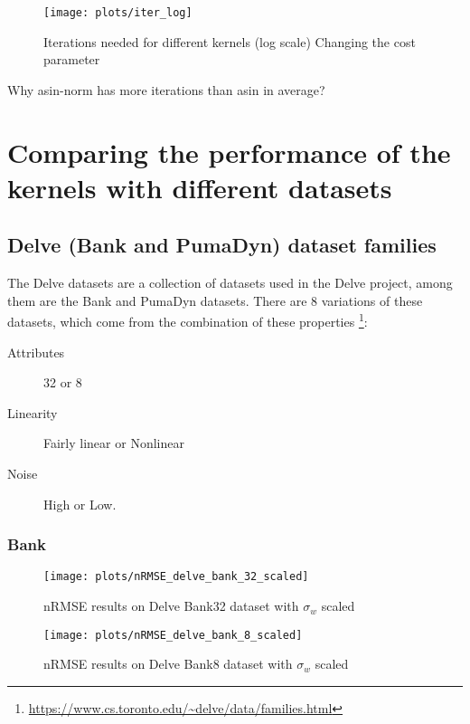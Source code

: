 \begin{figure}[H]
    \texttt{[image: plots/iter\_log]}
    \caption{Iterations needed for different kernels (log scale) Changing the cost
        parameter}
\end{figure}

\begin{cnote}
    Why asin-norm has more iterations than asin in average?
\end{cnote}

\section{Comparing the performance of the kernels with different datasets}%

\subsection{Delve (Bank and PumaDyn) dataset families}

The Delve datasets are a collection of datasets used in the Delve project,
among them are the Bank and PumaDyn datasets. There are 8 variations of
these datasets, which come from the combination of these properties%
\footnote{\url{https://www.cs.toronto.edu/~delve/data/families.html}}:
\begin{description}
    \item[Attributes] 32 or 8
    \item[Linearity] Fairly linear or Nonlinear
    \item[Noise] High or Low.
\end{description}


\subsubsection{Bank}

\begin{figure}[H]
    \texttt{[image: plots/nRMSE\_delve\_bank\_32\_scaled]}
    \caption{nRMSE results on Delve Bank32 dataset with $\sigma_w$ scaled}
    \label{fig:nrmse-delve-bank-32-scaled}
\end{figure}

\begin{figure}[H]
    \texttt{[image: plots/nRMSE\_delve\_bank\_8\_scaled]}
    \caption{nRMSE results on Delve Bank8 dataset with $\sigma_w$ scaled}
    \label{fig:nrmse-delve-bank-8-scaled}
\end{figure}

